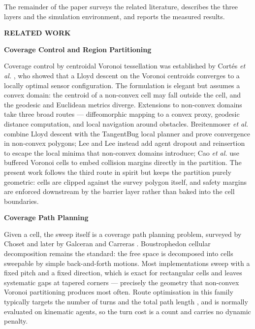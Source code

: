 \documentclass[10pt,letterpaper]{article}
\newcommand{\headingone}[1]{%
    \par\vspace{9pt}%
    {\centering\fontsize{12}{14}\selectfont\bfseries\MakeUppercase{#1}\par}%
    \vspace{4pt}\noindent\ignorespaces}
\newcommand{\headingtwo}[1]{%
    \par\vspace{7pt}%
    {\centering\fontsize{12}{14}\selectfont\bfseries #1\par}%
    \vspace{3pt}\noindent\ignorespaces}
\newcommand{\cit}[1]{\cite{#1}}
\begin{document}
The remainder of the paper surveys the related literature, describes the three layers and
the simulation environment, and reports the measured results.

\headingone{Related Work}

\headingtwo{Coverage Control and Region Partitioning}

Coverage control by centroidal Voronoi tessellation was established by Cort\'es
\emph{et al.} \cit{cortesCoverageControl2004}, who showed that a Lloyd descent
\cit{lloydLeastSquaresQuantization1982} on the Voronoi centroids
\cit{duCentroidalVoronoiTessellations1999} converges to a locally optimal sensor
configuration. The formulation is elegant but assumes a convex domain: the centroid of a
non-convex cell may fall outside the cell, and the geodesic and Euclidean metrics
diverge. Extensions to non-convex domains take three broad routes --- diffeomorphic
mapping to a convex proxy, geodesic distance computation, and local navigation around
obstacles. Breitenmoser \emph{et al.} \cit{breitenmoserVoronoiCoverage2010} combine Lloyd
descent with the TangentBug local planner and prove convergence in non-convex polygons;
Lee and Lee \cit{leeAdaptiveCentroidalVoronoi2024} instead add agent dropout and
reinsertion to escape the local minima that non-convex domains introduce; Cao \emph{et
    al.} \cit{caoDistributedWeightedCoverage2023} use buffered Voronoi cells to embed
collision margins directly in the partition. The present work follows the third route in
spirit but keeps the partition purely geometric: cells are clipped against the survey
polygon itself, and safety margins are enforced downstream by the barrier layer rather
than baked into the cell boundaries.

\headingtwo{Coverage Path Planning}

Given a cell, the sweep itself is a coverage path planning problem, surveyed by Choset
\cit{chosetCoverageSurvey2001} and later by Galceran and Carreras
\cit{galceranCoveragePathPlanning2013}. Boustrophedon cellular decomposition
\cit{chosetBoustrophedonDecomposition1998} remains the standard: the free space is
decomposed into cells sweepable by simple back-and-forth motions. Most implementations
sweep with a fixed pitch and a fixed direction, which is exact for rectangular cells and
leaves systematic gaps at tapered corners --- precisely the geometry that non-convex
Voronoi partitioning produces most often. Route optimisation in this family typically
targets the number of turns and the total path length
\cit{huRoutePlanning2021,galceranCoveragePathPlanning2013}, and is normally evaluated on
kinematic agents, so the turn cost is a count and carries no dynamic penalty.
\end{document}
